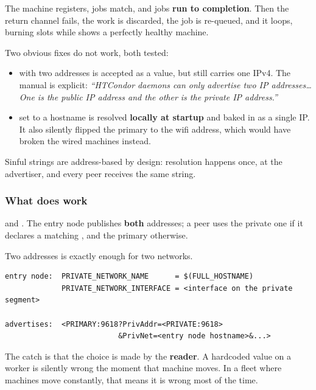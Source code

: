 \begin{trap}
The machine registers, jobs match, and jobs \textbf{run to completion}. Then the
return channel fails, the work is discarded, the job is re-queued, and it loops,
burning slots while  shows a perfectly healthy machine.
\end{trap}

Two obvious fixes do not work, both tested:

\begin{itemize}
  \item {} with two addresses is accepted as a value, but
         still carries one IPv4. The manual is explicit: \emph{``HTCondor
        daemons can only advertise two IP addresses\ldots One is the public IP
        address and the other is the private IP address.''}
  \item {} set to a hostname is resolved \textbf{locally
        at startup} and baked in as a single IP. It also silently flipped the
        primary to the wifi address, which would have broken the wired machines
        instead.
\end{itemize}

Sinful strings are address-based by design: resolution happens once, at the
advertiser, and every peer receives the same string.

\subsubsection{What does work}

 and . The entry node
publishes \textbf{both} addresses; a peer uses the private one if it declares a
matching , and the primary otherwise.

Two addresses is exactly enough for two networks.

\begin{lstlisting}
entry node:  PRIVATE_NETWORK_NAME      = $(FULL_HOSTNAME)
             PRIVATE_NETWORK_INTERFACE = <interface on the private segment>

advertises:  <PRIMARY:9618?PrivAddr=<PRIVATE:9618>
                          &PrivNet=<entry node hostname>&...>
\end{lstlisting}

The catch is that the choice is made by the \textbf{reader}. A hardcoded value on
a worker is silently wrong the moment that machine moves. In a fleet where
machines move constantly, that means it is wrong most of the time.

